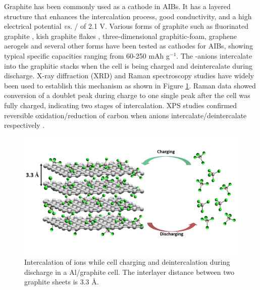\documentclass{article}
\begin{document}
Graphite has been commonly used as a cathode in AIBs. It has a layered structure that enhances the intercalation process, good conductivity, and a high electrical potential {\it vs.} / of 2.1 V. Various forms of graphite such as fluorinated graphite \cite{rani_fluorinated_2013}, kish graphite flakes \cite{wang_kish_2017}, three-dimensional graphitic-foam\cite{wu_3d_2016}, graphene aerogels\cite{huang_graphene_2019} and several other forms have been tested as cathodes for AIBs, showing typical specific capacities ranging from 60-250 mAh g$^{-1}$. The -anions intercalate into the graphitic stacks when the cell is being charged and deintercalate during discharge. X-ray diffraction (XRD) and Raman spectroscopy studies have widely been used to establish this mechanism \cite{rani_fluorinated_2013, wang_advanced_2017, lin_ultrafast_2015} as shown in Figure \ref{SF:graphitemech}. Raman data showed conversion of a doublet peak during charge to one single peak after the cell was fully charged, indicating two stages of intercalation. XPS studies confirmed reversible oxidation/reduction of carbon when  anions intercalate/deintercalate respectively \cite{stadie_zeolite-templated_2017, liu_binder-free_2019,wei_amorphous_2017}.

\begin{figure}[tbh!]
  \centering
  \includegraphics[width=\textwidth]{SF/graphitemech}
    \caption{Intercalation of  ions while cell charging and deintercalation during discharge in a Al/graphite cell. The interlayer distance between two graphite sheets is 3.3 \AA.}
  \label{SF:graphitemech}
\end{figure}
\end{document}
